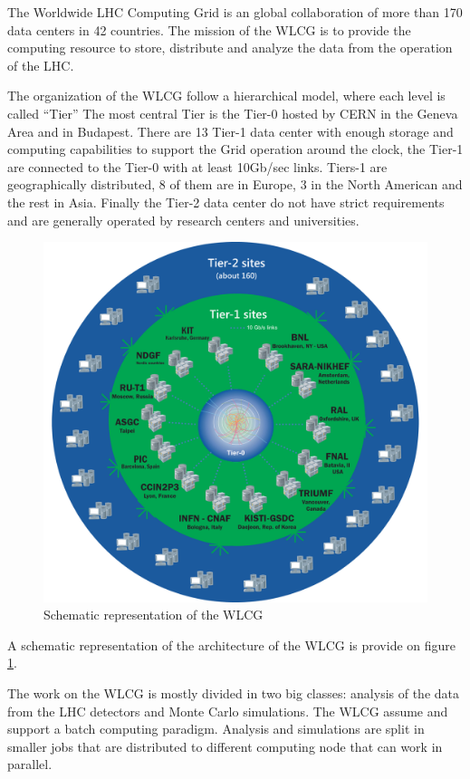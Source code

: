 The Worldwide LHC Computing Grid is an global collaboration of more than 170
data centers in 42 countries.  The mission of the WLCG is to provide the
computing resource to store, distribute and analyze the data from the operation
of the LHC.

The organization of the WLCG follow a hierarchical model, where each level is
called “Tier” The most central Tier is the Tier-0 hosted by CERN in the Geneva
Area and in Budapest. There are 13 Tier-1 data center with enough storage and
computing capabilities to support the Grid operation around the clock, the
Tier-1 are connected to the Tier-0 with at least 10Gb/sec links.  Tiers-1 are
geographically distributed, 8 of them are in Europe, 3 in the North American
and the rest in Asia. Finally the Tier-2 data center do not have strict
requirements and are generally operated by research centers and universities.

\begin{figure}
\includegraphics[width=\textwidth,height=\textheight,keepaspectratio]{gfx/WLCG}
\caption{Schematic representation of the WLCG}
\label{fig:wlcg-schema}
\end{figure}

A schematic representation of the architecture of the WLCG is provide on figure
\ref{fig:wlcg-schema}.


The work on the WLCG is mostly divided in two big classes: analysis of the data
from the LHC detectors and Monte Carlo simulations.  The WLCG assume and
support a batch computing paradigm. Analysis and simulations are split in
smaller jobs that are distributed to different computing node that can work in
parallel.

